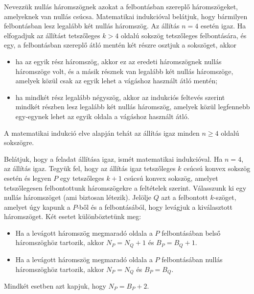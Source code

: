 \begin{solution}
Nevezzük nullás háromszögnek azokat a felbontásban szereplő háromszögeket,
amelyeknek van nullás csúcsa. Matematikai indukcióval belátjuk, hogy
bármilyen felbontásban lesz legalább két nullás háromszög. Az állítás
$n=4$ esetén igaz. Ha elfogadjuk az állítást tetszőleges $k>4$ oldalú
sokszög tetszőleges felbontására, és egy, a felbontásban szereplő
átló mentén két részre osztjuk a sokszöget, akkor 
\begin{itemize}
\item ha az egyik rész háromszög, akkor ez az eredeti háromszögnek nullás
háromszöge volt, és a másik résznek van legalább két nullás háromszöge,
amelyek közül csak az egyik lehet a vágáshoz használt átló mentén; 
\item ha mindkét rész legalább négyszög, akkor az indukciós feltevés szerint
mindkét részben lesz legalább két nullás háromszög, amelyek közül
legfennebb egy-egynek lehet az egyik oldala a vágáshoz használt átló. 
\end{itemize}
A matematikai indukció elve alapján tehát az állítás igaz minden $n\ge4$
oldalú sokszögre.

Belátjuk, hogy a feladat állítása igaz, ismét matematikai indukcióval.
Ha $n=4$, az állítás igaz. Tegyük fel, hogy az állítás igaz tetszőleges
$k$ csúcsú konvex sokszög esetén és legyen $P$ egy tetszőleges $k+1$
csúcsú konvex sokszög, amelyet tetszőlegesen felbontottunk háromszögekre
a feltételek szerint. Válasszunk ki egy nullás háromszöget (ami biztosan
létezik). Jelölje $Q$ azt a felbontott $k$-szöget, amelyet úgy kapunk
a $P$-ből és a felbontásából, hogy levágjuk a kiválasztott háromszöget.
Két esetet különböztetünk meg: 
\begin{itemize}
\item Ha a levágott háromszög megmaradó oldala a $P$ felbontásában belső
háromszöghöz tartozik, akkor $N_{P}=N_{Q}+1$ és $B_{P}=B_{Q}+1$. 
\item Ha a levágott háromszög megmaradó oldala a $P$ felbontásában nullás
háromszöghöz tartozik, akkor $N_{P}=N_{Q}$ és $B_{P}=B_{Q}$. 
\end{itemize}
Mindkét esetben azt kapjuk, hogy $N_{P}=B_{P}+2$. 
\end{solution}
%
% 
%
